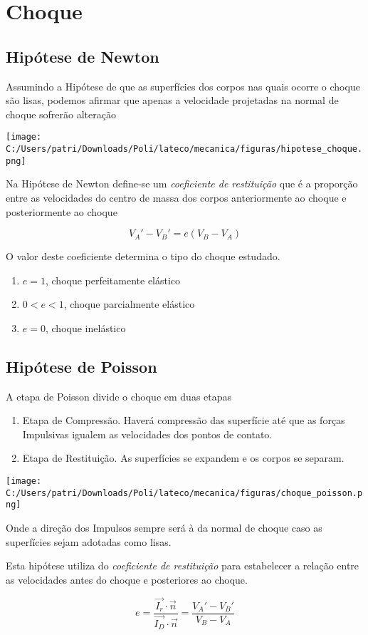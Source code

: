 \section{Choque}

\subsection{Hipótese de Newton}

Assumindo a Hipótese de que as superfícies dos corpos nas quais ocorre o choque são lisas, podemos afirmar que apenas a velocidade projetadas na normal de choque sofrerão alteração

\begin{center}
\texttt{[image: C:/Users/patri/Downloads/Poli/lateco/mecanica/figuras/hipotese\_choque.png]}
\end{center}

Na Hipótese de Newton define-se um \textit{coeficiente de restituição} que é a proporção entre as velocidades do centro de massa dos corpos anteriormente ao choque e posteriormente ao choque

$$ \boxed{V_A' - V_B' = e(V_B - V_A)} $$

O valor deste coeficiente determina o tipo do choque estudado.

\begin{enumerate}
	\item $e = 1$, choque perfeitamente elástico
	\item $0 < e < 1$, choque parcialmente elástico
	\item $e = 0$, choque inelástico
\end{enumerate}

\subsection{Hipótese de Poisson}

A etapa de Poisson divide o choque em duas etapas

\begin{enumerate}
	\item Etapa de Compressão. Haverá compressão das superfície até que as forças Impulsivas igualem as velocidades dos pontos de contato.
	\item Etapa de Restituição. As superfícies se expandem e os corpos se separam.
\end{enumerate}

\begin{center}
\texttt{[image: C:/Users/patri/Downloads/Poli/lateco/mecanica/figuras/choque\_poisson.png]}
\end{center}

Onde a direção dos Impulsos sempre será à da normal de choque caso as superfícies sejam adotadas como lisas.

Esta hipótese utiliza do \textit{coeficiente de restituição} para estabelecer a relação entre as velocidades antes do choque e posteriores ao choque.

$$ \boxed{e = \frac{\vec{I_r}\cdot \vec{n}}{\vec{I_D}\cdot \vec{n}} = \frac{V_A' - V_B'}{V_B - V_A}} $$
